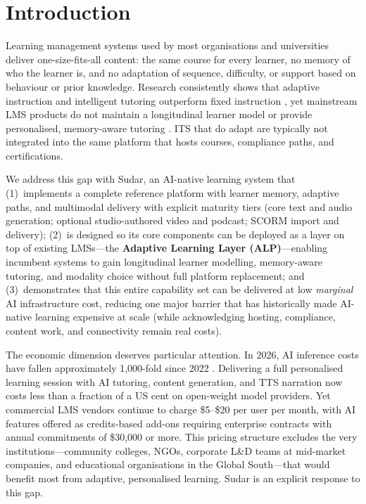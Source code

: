 \documentclass[10pt,twocolumn]{article}
\begin{document}
\section{Introduction}
\label{sec:intro}

Learning management systems used by most organisations and universities
deliver one-size-fits-all content: the same course for every learner,
no memory of who the learner is, and no adaptation of sequence,
difficulty, or support based on behaviour or prior knowledge. Research
consistently shows that adaptive instruction and intelligent tutoring
outperform fixed instruction \cite{vanlehn2011,aleven2016}, yet
mainstream LMS products do not maintain a longitudinal learner model
or provide personalised, memory-aware tutoring
\cite{zawacki2019,adnan2023}. ITS that do adapt are typically not
integrated into the same platform that hosts courses, compliance paths,
and certifications.

We address this gap with Sudar, an AI-native learning system that
(1)~implements a complete reference platform with learner memory,
adaptive paths, and multimodal delivery with explicit maturity tiers
(core text and audio generation; optional studio-authored video and
podcast; SCORM import and delivery);
(2)~is designed so its core components can be deployed as a layer on
top of existing LMSs---the \textbf{Adaptive Learning Layer
(ALP)}---enabling incumbent systems to gain longitudinal learner
modelling, memory-aware tutoring, and modality choice without full
platform replacement; and (3)~demonstrates that this entire capability
set can be delivered at low \emph{marginal} AI infrastructure cost,
reducing one major barrier that has historically made AI-native
learning expensive at scale (while acknowledging hosting, compliance,
content work, and connectivity remain real costs).

The economic dimension deserves particular attention. In 2026, AI
inference costs have fallen approximately 1,000-fold since 2022
\cite{a16z2024llmflation}. Delivering a full personalised learning
session with AI tutoring, content generation, and TTS narration now
costs less than a fraction of a US cent on open-weight model providers.
Yet commercial LMS vendors continue to charge \$5--\$20 per user per
month, with AI features offered as credits-based add-ons requiring
enterprise contracts with annual commitments of \$30,000 or more. This
pricing structure excludes the very institutions---community colleges,
NGOs, corporate L\&D teams at mid-market companies, and educational
organisations in the Global South---that would benefit most from
adaptive, personalised learning. Sudar is an explicit response to this
gap.
\end{document}
